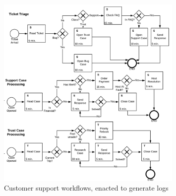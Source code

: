 \begin{figure}[h!]
  \centering
  \includegraphics[width=0.8\textwidth]{tex/workflows.png}
  \caption{Customer support workflows, enacted to generate logs}
  \label{fig:workflows}
\end{figure}

